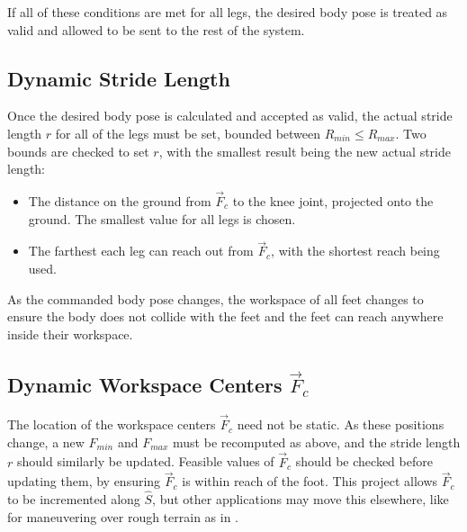If all of these conditions are met for all legs, the desired body pose is treated as valid and allowed to be sent to the rest of the system. 

\subsection{ Dynamic Stride Length }

Once the desired body pose is calculated and accepted as valid, the actual stride length $r$ for all of the legs must be set, bounded between $R_{min} \le R_{max}$. Two bounds are checked to set $r$, with the smallest result being the new actual stride length:

\begin{itemize}
    \item The distance on the ground from $\vec{F}_c$ to the knee joint, projected onto the ground. The smallest value for all legs is chosen.

    \item The farthest each leg can reach out from $\vec{F}_c$, with the shortest reach being used. 
\end{itemize}

As the commanded body pose changes, the workspace of all feet changes to ensure the body does not collide with the feet and the feet can reach anywhere inside their workspace. 

\subsection{ Dynamic Workspace Centers $\vec{F}_c$ }
The location of the workspace centers $\vec{F}_c$ need not be static. As these positions change, a new $F_{min}$ and $F_{max}$ must be recomputed as above, and the stride length $r$ should similarly be updated. Feasible values of $\vec{F}_c$ should be checked before updating them, by ensuring $\vec{F}_c$ is within reach of the foot. This project allows $\vec{F}_c$ to be incremented along $\hat{S}$, but other applications may move this elsewhere, like for maneuvering over rough terrain as in \cite{foot_placement}. 



